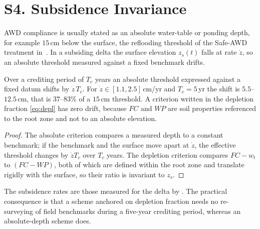 \section*{S4. Subsidence Invariance}

AWD compliance is usually stated as an absolute water-table or ponding depth,
for example $15$\,cm below the surface, the reflooding threshold of the Safe-AWD
treatment in~\cite{balaine2019}. In a subsiding delta
the surface elevation $z_s(t)$ falls at rate $\dot z$, so an absolute threshold
measured against a fixed benchmark drifts.

\begin{proposition}
\label{prop:subsid}
Over a crediting period of $T_c$ years an absolute threshold expressed against
a fixed datum shifts by $\dot z\,T_c$. For $\dot z\in[1.1,2.5]$\,cm/yr and
$T_c=5$\,yr the shift is $5.5$--$12.5$\,cm, that is $37$--$83\%$ of a
$15$\,cm threshold. A criterion written in the depletion fraction
\eqref{eq:depl} has zero drift, because $FC$ and $WP$ are soil properties
referenced to the root zone and not to an absolute elevation.
\end{proposition}

\begin{proof}
The absolute criterion compares a measured depth to a constant benchmark; if
the benchmark and the surface move apart at $\dot z$, the effective threshold
changes by $\dot z T_c$ over $T_c$ years. The depletion criterion compares
$FC-w_t$ to $(FC-WP)$, both of which are defined within the root zone and
translate rigidly with the surface, so their ratio is invariant to $z_s$.
\end{proof}

The subsidence rates are those measured for the delta by
\cite{minderhoud2017}. The practical consequence is that a scheme anchored on
depletion fraction needs no re-surveying of field benchmarks during a five-year
crediting period, whereas an absolute-depth scheme does.
